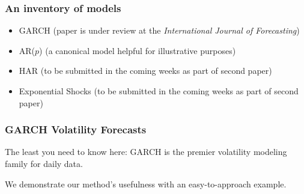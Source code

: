 \documentclass[9pt]{beamer}
\theoremstyle{definition}
\begin{document}
\begin{frame}
    \frametitle{An inventory of models}

    \begin{itemize}
        \item <1-> GARCH (paper is under review at the \textit{International Journal of Forecasting})
        \item <2-> AR($p$) (a canonical model helpful for illustrative purposes)
        \item <2-> HAR (to be submitted in the coming weeks as part of second paper)
        \item <3-> Exponential Shocks (to be submitted in the coming weeks as part of second paper)

    \end{itemize}
\end{frame}

\begin{frame}
    \frametitle{GARCH Volatility Forecasts}
    The least you need to know here: GARCH is the premier volatility modeling family for daily data.

    \bigskip

    We demonstrate our method's usefulness with an easy-to-approach example.
\end{frame}




    
\end{document}
